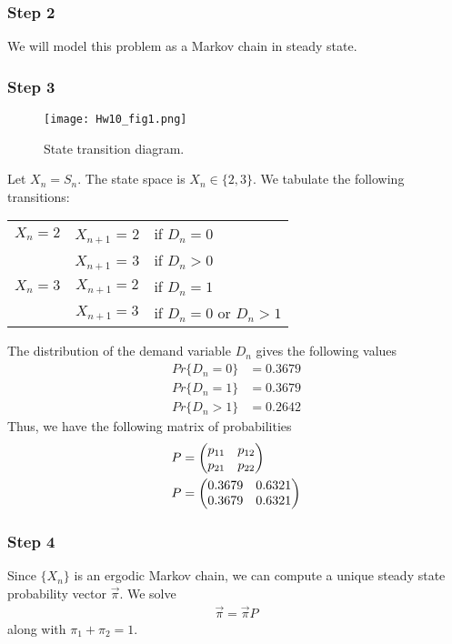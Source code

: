 \documentclass[11pt,letterpaper]{article}
\begin{document}
\subsubsection*{Step 2}
We will model this problem as a Markov chain in steady state.




\newpage
\subsubsection*{Step 3}

\begin{wrapfigure}[14]{r}{0.5\textwidth}
\texttt{[image: Hw10\_fig1.png]}
\caption{\label{aq:state:fig} State transition diagram.}
\end{wrapfigure}

Let $X_n = S_n$. The state space is $X_n \in \{2,3\}$. We tabulate the following transitions:

\begin{tabular}{ c c l }
$X_n =2$ & $X_{n+1}$ = 2 & if $D_n = 0$ \\
& $X_{n+1}$ = 3 & if $D_n > 0$ \\
$X_n = 3$ & $X_{n+1} = 2$ & if $D_n = 1$ \\
& $X_{n+1} = 3$ & if $D_n = 0$ or $D_n > 1$
\end{tabular}


The distribution of the demand variable $D_n$ gives the following values
\begin{align*}
Pr\{D_n = 0\} & = 0.3679 \\
Pr\{D_n = 1\} & = 0.3679 \\
Pr\{D_n > 1\} & = 0.2642
\end{align*}
Thus, we have the following matrix of probabilities
\begin{align} \label{aq:P}
P & =
	\begin{pmatrix}
    p_{11} & p_{12} \\
    p_{21} & p_{22}
    \end{pmatrix} \notag \\
P & =
	\begin{pmatrix}
    0.3679 & 0.6321 \\
    0.3679 & 0.6321
    \end{pmatrix}
\end{align}





\subsubsection*{Step 4}
Since $\{X_n\}$ is an ergodic Markov chain, we can compute a unique steady state probability vector $\vec{\pi}$. We solve
\begin{align*}
\vec{\pi} = \vec{\pi} P
\end{align*}
along with $\pi_1 + \pi_2 = 1$.
\end{document}
